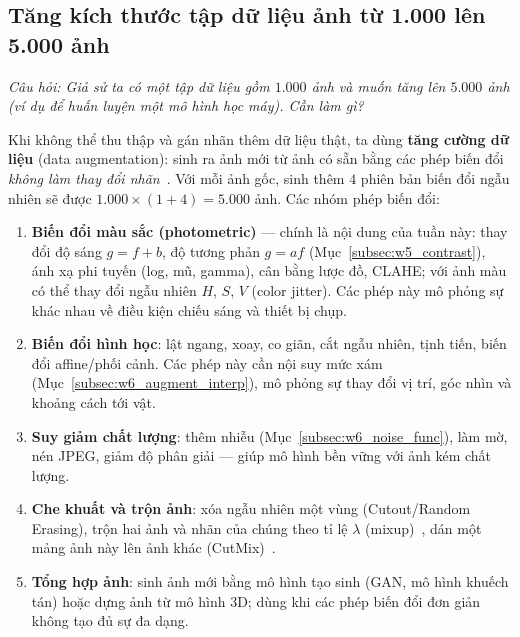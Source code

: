 \subsection{Tăng kích thước tập dữ liệu ảnh từ 1.000 lên 5.000 ảnh}
\label{subsec:w5_augmentation}

\textit{Câu hỏi: Giả sử ta có một tập dữ liệu gồm $1.000$ ảnh và muốn tăng lên $5.000$ ảnh (ví dụ để huấn luyện một mô hình học máy). Cần làm gì?}

Khi không thể thu thập và gán nhãn thêm dữ liệu thật, ta dùng \textbf{tăng cường dữ liệu} (data augmentation): sinh ra ảnh mới từ ảnh có sẵn bằng các phép biến đổi \emph{không làm thay đổi nhãn}~\citep{shorten2019survey}. Với mỗi ảnh gốc, sinh thêm $4$ phiên bản biến đổi ngẫu nhiên sẽ được $1.000 \times (1 + 4) = 5.000$ ảnh. Các nhóm phép biến đổi:

\begin{enumerate}
    \item \textbf{Biến đổi màu sắc (photometric)} — chính là nội dung của tuần này: thay đổi độ sáng $g = f + b$, độ tương phản $g = a f$ (Mục~\ref{subsec:w5_contrast}), ánh xạ phi tuyến (log, mũ, gamma), cân bằng lược đồ, CLAHE; với ảnh màu có thể thay đổi ngẫu nhiên $H$, $S$, $V$ (color jitter). Các phép này mô phỏng sự khác nhau về điều kiện chiếu sáng và thiết bị chụp.
    \item \textbf{Biến đổi hình học}: lật ngang, xoay, co giãn, cắt ngẫu nhiên, tịnh tiến, biến đổi affine/phối cảnh. Các phép này cần nội suy mức xám (Mục~\ref{subsec:w6_augment_interp}), mô phỏng sự thay đổi vị trí, góc nhìn và khoảng cách tới vật.
    \item \textbf{Suy giảm chất lượng}: thêm nhiễu (Mục~\ref{subsec:w6_noise_func}), làm mờ, nén JPEG, giảm độ phân giải — giúp mô hình bền vững với ảnh kém chất lượng.
    \item \textbf{Che khuất và trộn ảnh}: xóa ngẫu nhiên một vùng (Cutout/Random Erasing), trộn hai ảnh và nhãn của chúng theo tỉ lệ $\lambda$ (mixup)~\citep{zhang2018mixup}, dán một mảng ảnh này lên ảnh khác (CutMix)~\citep{yun2019cutmix}.
    \item \textbf{Tổng hợp ảnh}: sinh ảnh mới bằng mô hình tạo sinh (GAN, mô hình khuếch tán) hoặc dựng ảnh từ mô hình 3D; dùng khi các phép biến đổi đơn giản không tạo đủ sự đa dạng.
\end{enumerate}

